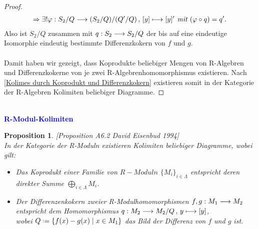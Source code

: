 \documentclass[10pt,a4paper]{report}
\newcommand{\ModulsOfDifferenzials}{David Eisenbud 1994}
\newcounter{Aussage}[chapter]
\newtheorem{prop}[Aussage]{Proposition}
\newcommand{\functionfront}[3]{\nolinebreak{#1:#2 \longrightarrow #3}}
\newcommand{\function}[5]{\nolinebreak{#1:#2 \longrightarrow #3 \, , \, #4 \longmapsto #5}}
\newcommand*{\defeq}{\mathrel{\vcenter{\baselineskip0.5ex \lineskiplimit0pt
                     \hbox{\scriptsize.}\hbox{\scriptsize.}}}%
                     =}
\begin{document}
\begin{proof}
\begin{gather*}
\Rightarrow \exists ! \function{\varphi}{S_2/Q}{(S_2/Q)/(Q'/Q)}{[y]}{[y]'}\textit{ mit }(\varphi \circ q) = q'.
\end{gather*}
Also ist $S_2/Q$ zusammen mit $\functionfront{q}{S_2}{S_2/Q}$ der bis auf eine eindeutige Isomorphie eindeutig bestimmte Differenzkokern von $f$ und $g$.\\
\ \\
Damit haben wir gezeigt, dass Koprodukte beliebiger Mengen von R-Algebren und Differenzkokerne von je zwei R-Algebrenhomomorphismus existieren. Nach \cref{Kolimes durch Koprodukt und Differenzkokern} existieren somit in der Kategorie der R-Algebren Kolimiten beliebiger Diagramme.
\end{proof}


\ \\
\textcolor{blue}{\textbf{R-Modul-Kolimiten}}
\begin{prop}\label{R-Modul-Kolimiten} \textit{[Proposition A6.2 \ModulsOfDifferenzials]}\\
In der Kategorie der R-Moduln existieren Kolimiten beliebiger Diagramme, wobei gilt:
\begin{itemize}
\item[\textbf{1.}] Das Koprodukt einer Familie von $R-Moduln$ $\lbrace M_i \rbrace_{i \in \Lambda}$ entspricht deren direkter Summe $\bigoplus_{i \in \Lambda} M_i$.
\item[\textbf{2.}] Der Differenzenkokern zweier R-Modulhomomorphismen $\functionfront{f,g}{M_1}{M_2}$ entspricht dem Homomorphismus $\function{q}{M_2}{M_2/Q}{y}{[y]}$,\\
wobei $Q \defeq \lbrace f(x) - g(x)\mid x \in M_1 \rbrace$ das Bild der Differenz von $f$ und $g$ ist.
\end{itemize}
\end{prop}
\end{document}
